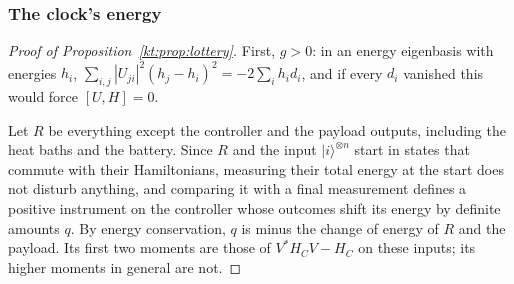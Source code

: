 \subsubsection{The clock's energy}\label{kt:pf:lottery}

\begin{proof}[Proof of Proposition~\ref{kt:prop:lottery}]
First, $g>0$: in an energy eigenbasis with energies $h_i$, $\sum_{i,j}|U_{ji}|^2(h_j-h_i)^2=-2\sum_ih_id_i$, and if every $d_i$ vanished this would force $[U,H]=0$.

Let $R$ be everything except the controller and the payload outputs, including the heat baths and the battery. Since $R$ and the input $|i\rangle^{\otimes n}$ start in states that commute with their Hamiltonians, measuring their total energy at the start does not disturb anything, and comparing it with a final measurement defines a positive instrument on the controller whose outcomes shift its energy by definite amounts $q$. By energy conservation, $q$ is minus the change of energy of $R$ and the payload. Its first two moments are those of $V^*H_CV-H_C$ on these inputs; its higher moments in general are not.


\end{proof}
